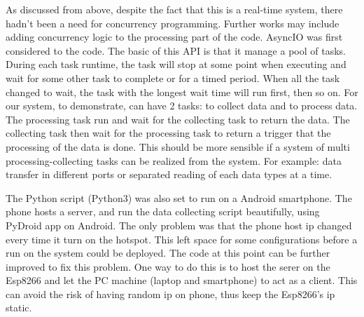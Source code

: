 \documentclass[12 pt, a4paper]{thesis}
\begin{document}
As discussed from above, despite the fact that this is a real-time system, there hadn't been a need for concurrency programming. Further works may include adding concurrency logic to the processing part of the code. AsyncIO was first considered to the code. The basic of this API is that it manage a pool of tasks. During each task runtime, the task will stop at some point when executing and wait for some other task to complete or for a timed period. When all the task changed to wait, the task with the longest wait time will run first, then so on. For our system, to demonstrate, can have 2 tasks: to collect data and to process data. The processing task run and wait for the collecting task to return the data. The collecting task then wait for the processing task to return a trigger that the processing of the data is done. This should be more sensible if a system of multi processing-collecting tasks can be realized from the system. For example: data transfer in different ports or separated reading of each data types at a time. 

The Python script (Python3) was also set to run on a Android smartphone. The phone hosts a server, and run the data collecting script beautifully, using PyDroid app on Android. The only problem was that the phone host ip changed every time it turn on the hotspot. This left space for some configurations before a run on the system could be deployed. The code at this point can be further improved to fix this problem. One way to do this is to host the serer on the Esp8266 and let the PC machine (laptop and smartphone) to act as a client. This can avoid the risk of having random ip on phone, thus keep the Esp8266's ip static.
\end{document}
